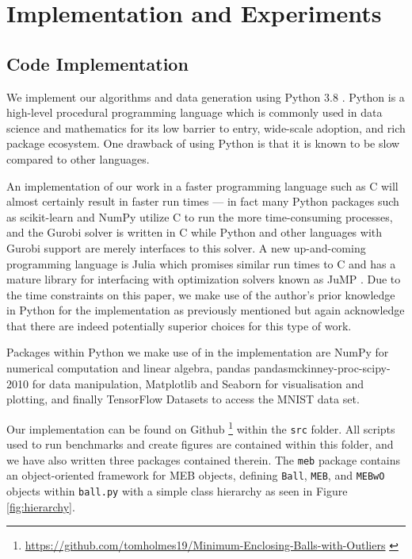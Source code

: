 \documentclass[11pt,twoside]{report}
\theoremstyle{definition}
\numberwithin{theorem}{section}
\numberwithin{definition}{section}
\numberwithin{lemma}{section}
\numberwithin{proposition}{section}
\numberwithin{equation}{section}
\numberwithin{figure}{section}
\begin{document}
\chapter{Implementation and Experiments}\label{implementation}
\section{Code Implementation}
We implement our algorithms and data generation using Python 3.8 \cite{python}. Python is a high-level procedural programming language which is commonly used in data science and mathematics for its low barrier to entry, wide-scale adoption, and rich package ecosystem. One drawback of using Python is that it is known to be slow compared to other languages.

An implementation of our work in a faster programming language such as C \cite{kernighan2006c} will almost certainly result in faster run times --- in fact many Python packages such as scikit-learn \cite{scikit-learn} and NumPy \cite{numpy} utilize C to run the more time-consuming processes, and the Gurobi \cite{gurobi} solver is written in C while Python and other languages with Gurobi support are merely interfaces to this solver. A new up-and-coming programming language is Julia \cite{bezanson2017julia} which promises similar run times to C and has a mature library for interfacing with optimization solvers known as JuMP \cite{jump}. Due to the time constraints on this paper, we make use of the author's prior knowledge in Python for the implementation as previously mentioned but again acknowledge that there are indeed potentially superior choices for this type of work.

Packages within Python we make use of in the implementation are NumPy \cite{numpy} for numerical computation and linear algebra, pandas \cite{pandasjeff_reback_2021_5060318}{pandasmckinney-proc-scipy-2010} for data manipulation, Matplotlib \cite{matplotlib} and Seaborn \cite{seaborn} for visualisation and plotting, and finally TensorFlow Datasets \cite{TFDS} to access the MNIST \cite{lecun2010mnist} data set.

Our implementation can be found on Github \footnote{\url{https://github.com/tomholmes19/Minimum-Enclosing-Balls-with-Outliers} \cite{Holmes_Minimum_Enclosing_Balls_2021}} within the \texttt{src} folder. All scripts used to run benchmarks and create figures are contained within this folder, and we have also written three packages contained therein. The \texttt{meb} package contains an object-oriented framework for MEB objects, defining \texttt{Ball}, \texttt{MEB}, and \texttt{MEBwO} objects within \texttt{ball.py} with a simple class hierarchy as seen in Figure \ref{fig:hierarchy}. 
\end{document}
